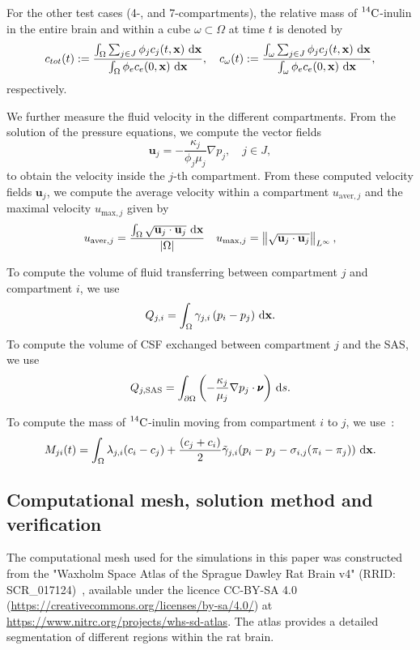 \documentclass[a4paper,11pt]{article}
\newcommand{\1}{^{(1)}}
\newcommand{\2}{^{(2)}}
\newcommand*{\dd}{\mathop{\kern0pt\mathrm{d}}\!{}}
\newcommand{\norm}[1]{\left\lVert#1\right\rVert}
\newcommand {\x}   {\mathbf{x}}
\newcommand{\Cinulin}{$\prescript{14}{}{\text{C}}$-inulin }
\begin{document}
For the other test cases (4-, and 7-compartments), the relative mass of \Cinulin in the entire brain and within a cube $\omega \subset \Omega$ at time $t$ is denoted by
\[
c_{tot}(t) := \frac{\int_\Omega \sum_{j\in J}  \phi_j c_j(t,\x) \, \dd \x }{ \int_\Omega \phi_e c_e(0,\x) \, \dd \x}, \quad c_{\omega}(t) := \frac{\int_{\omega} \sum_{j\in J} \phi_j c_j(t,\x) \, \dd \x }{ \int_\omega \phi_e c_e(0,\x) \, \dd \x},
\]
respectively. 

We further measure the fluid velocity in the different compartments. From the solution of the pressure equations, we compute the vector fields
\begin{equation}
    \mathbf u_j = -\frac{\kappa_j}{\phi_j \mu_j}\nabla p_j, \quad j\in J, 
    \label{eq:velo}
\end{equation}
to obtain the velocity inside the $j$-th compartment. 
From these computed velocity fields $\mathbf{u}_j$, we compute the average velocity within a compartment $u_{\text{aver},j}$ and the maximal velocity $u_{\text{max},j}$ given by 
\begin{equation}
u_{\text{aver},j} = \frac{\int_\Omega \sqrt{\mathbf u_j\cdot\mathbf u_j}  \, \dd \x }{| \Omega |}\quad u_{\text{max},j} = \norm{ \sqrt{\mathbf u_j\cdot\mathbf u_j} }_{L^\infty},
\end{equation}

To compute the volume of fluid transferring between compartment $j$ and compartment $i$, we use
\begin{equation}
Q_{j,i} = \int_{\Omega}  \gamma_{j , i} \left( p_i - p_j \right)\, \dd \x.
\label{eq:compute-transfer}
\end{equation}
To compute the volume of CSF exchanged between compartment $j$ and the SAS, we use 
\begin{equation}
Q_{j,\text{SAS}} = \int_{\partial \Omega} \left(- \frac{\kappa_j}{ \mu_j}\nabla p_j  \cdot\pmb{\nu}\right) \,\dd s.\label{eq:compute-transfer-SAS}
\end{equation}


To compute the mass of \Cinulin moving from compartment $i$ to $j$, we use~\cite{jarzynska2006application}: 
\begin{equation}
    M_{ji}(t) = \int_\Omega  \lambda_{j, i}( c_i- c_j) +  \frac{(c_j+c_i)}{2} \tilde \gamma_{j , i} (p_i - p_j-\sigma_{i,j}(\pi_i-\pi_j))  \, \dd \x.
    \label{eq:matrixM}
\end{equation}
\subsection{Computational mesh, solution method and verification} \label{section: mesh}
The computational mesh used for the simulations in this paper was constructed from the "Waxholm Space Atlas of the Sprague Dawley Rat Brain v4" (RRID: \textsf{SCR\_017124})~\cite{papp2014, atlasv3, atlasv4}, available under the licence CC-BY-SA 4.0 (\url{https://creativecommons.org/licenses/by-sa/4.0/}) at \url{https://www.nitrc.org/projects/whs-sd-atlas}. The atlas provides a detailed segmentation of different regions within the rat brain. 
\end{document}
